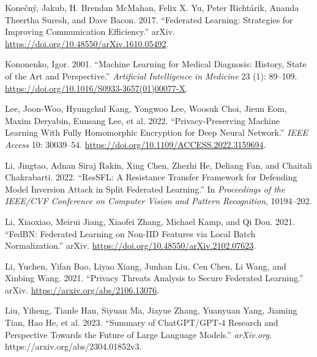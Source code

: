 \documentclass[
  compsoc]{IEEEtran}
\newlength{\cslhangindent}
\newlength{\cslentryspacingunit} %
\newenvironment{CSLReferences}[2] %
 {%
  \setlength{\parindent}{0pt}
  \ifodd #1
  \let\oldpar\par
  \def\par{\hangindent=\cslhangindent\oldpar}
  \fi
  \setlength{\parskip}{#2\cslentryspacingunit}
 }%
 {}
\begin{document}
\begin{CSLReferences}{1}{0}
\leavevmode{}%
Konečný, Jakub, H. Brendan McMahan, Felix X. Yu, Peter Richtárik, Ananda
Theertha Suresh, and Dave Bacon. 2017. {``Federated {Learning}:
{Strategies} for {Improving Communication Efficiency}.''} {arXiv}.
\url{https://doi.org/10.48550/arXiv.1610.05492}.

\leavevmode{}%
Kononenko, Igor. 2001. {``Machine Learning for Medical Diagnosis:
History, State of the Art and Perspective.''} \emph{Artificial
Intelligence in Medicine} 23 (1): 89--109.
\url{https://doi.org/10.1016/S0933-3657(01)00077-X}.

\leavevmode{}%
Lee, Joon-Woo, Hyungchul Kang, Yongwoo Lee, Woosuk Choi, Jieun Eom,
Maxim Deryabin, Eunsang Lee, et al. 2022. {``Privacy-{Preserving Machine
Learning With Fully Homomorphic Encryption} for {Deep Neural
Network}.''} \emph{IEEE Access} 10: 30039--54.
\url{https://doi.org/10.1109/ACCESS.2022.3159694}.

\leavevmode{}%
Li, Jingtao, Adnan Siraj Rakin, Xing Chen, Zhezhi He, Deliang Fan, and
Chaitali Chakrabarti. 2022. {``{ResSFL}: {A Resistance Transfer
Framework} for {Defending Model Inversion Attack} in {Split Federated
Learning}.''} In \emph{Proceedings of the {IEEE}/{CVF Conference} on
{Computer Vision} and {Pattern Recognition}}, 10194--202.

\leavevmode{}%
Li, Xiaoxiao, Meirui Jiang, Xiaofei Zhang, Michael Kamp, and Qi Dou.
2021. {``{FedBN}: {Federated Learning} on {Non-IID Features} via {Local
Batch Normalization}.''} {arXiv}.
\url{https://doi.org/10.48550/arXiv.2102.07623}.

\leavevmode{}%
Li, Yuchen, Yifan Bao, Liyao Xiang, Junhan Liu, Cen Chen, Li Wang, and
Xinbing Wang. 2021. {``Privacy {Threats Analysis} to {Secure Federated
Learning}.''} {arXiv}. \url{https://arxiv.org/abs/2106.13076}.

\leavevmode{}%
Liu, Yiheng, Tianle Han, Siyuan Ma, Jiayue Zhang, Yuanyuan Yang, Jiaming
Tian, Hao He, et al. 2023. {``Summary of {ChatGPT}/{GPT-4 Research} and
{Perspective Towards} the {Future} of {Large Language Models}.''}
\emph{arXiv.org}. https://arxiv.org/abs/2304.01852v3.


\end{CSLReferences}
\end{document}
